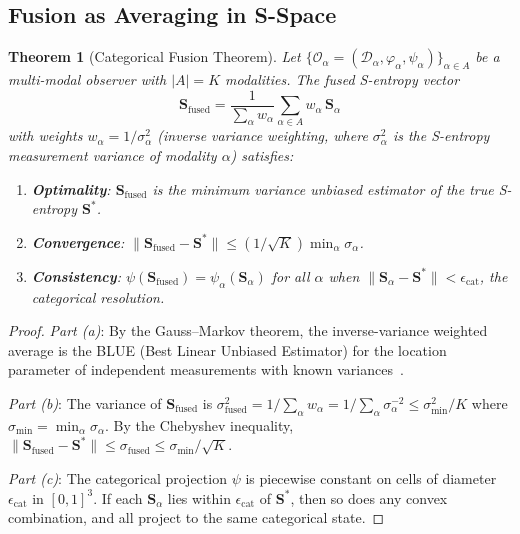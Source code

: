 \documentclass[twocolumn,10pt]{article}
\newtheorem{theorem}{Theorem}[section]
\theoremstyle{definition}
\theoremstyle{remark}
\newcommand{\Sent}{\mathbf{S}}
\newcommand{\Ocal}{\mathcal{O}}
\newcommand{\Dcal}{\mathcal{D}}
\begin{document}
\subsection{Fusion as Averaging in S-Space}

\begin{theorem}[Categorical Fusion Theorem]\label{thm:fusion}
Let $\{\Ocal_\alpha = (\Dcal_\alpha, \varphi_\alpha, \psi_\alpha)\}_{\alpha
\in A}$ be a multi-modal observer with $|A| = K$ modalities. The fused
S-entropy vector
\begin{equation}\label{eq:fusion}
  \Sent_{\mathrm{fused}} = \frac{1}{\sum_\alpha w_\alpha}
  \sum_{\alpha \in A} w_\alpha \, \Sent_\alpha
\end{equation}
with weights $w_\alpha = 1/\sigma_\alpha^2$ (inverse variance weighting,
where $\sigma_\alpha^2$ is the S-entropy measurement variance of modality
$\alpha$) satisfies:
\begin{enumerate}[label=(\alph*)]
  \item \textbf{Optimality}: $\Sent_{\mathrm{fused}}$ is the minimum
    variance unbiased estimator of the true S-entropy $\Sent^*$.
  \item \textbf{Convergence}: $\|\Sent_{\mathrm{fused}} - \Sent^*\| \leq
    (1/\sqrt{K}) \min_\alpha \sigma_\alpha$.
  \item \textbf{Consistency}: $\psi(\Sent_{\mathrm{fused}}) =
    \psi_\alpha(\Sent_\alpha)$ for all $\alpha$ when
    $\|\Sent_\alpha - \Sent^*\| < \epsilon_{\mathrm{cat}}$, the
    categorical resolution.
\end{enumerate}
\end{theorem}

\begin{proof}
\emph{Part (a)}: By the Gauss--Markov theorem, the inverse-variance
weighted average is the BLUE (Best Linear Unbiased Estimator) for the
location parameter of independent measurements with known
variances~\cite{cover2006}.

\emph{Part (b)}: The variance of $\Sent_{\mathrm{fused}}$ is
$\sigma_{\mathrm{fused}}^2 = 1/\sum_\alpha w_\alpha =
1/\sum_\alpha \sigma_\alpha^{-2} \leq \sigma_{\min}^2/K$
where $\sigma_{\min} = \min_\alpha \sigma_\alpha$. By the Chebyshev
inequality, $\|\Sent_{\mathrm{fused}} - \Sent^*\| \leq
\sigma_{\mathrm{fused}} \leq \sigma_{\min}/\sqrt{K}$.

\emph{Part (c)}: The categorical projection $\psi$ is piecewise constant
on cells of diameter $\epsilon_{\mathrm{cat}}$ in $[0,1]^3$. If each
$\Sent_\alpha$ lies within $\epsilon_{\mathrm{cat}}$ of $\Sent^*$, then
so does any convex combination, and all project to the same categorical
state.
\end{proof}
\end{document}
